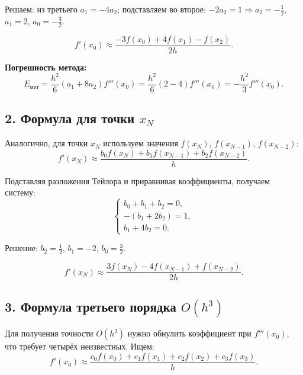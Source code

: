 \documentclass{article}
\begin{document}
Решаем: из третьего $a_1 = -4a_2$; подставляем во второе: $-2a_2 = 1 \Rightarrow a_2 = -\tfrac{1}{2}$, $a_1 = 2$, $a_0 = -\tfrac{3}{2}$.

\begin{equation}
\boxed{f'(x_0) \approx \frac{-3f(x_0) + 4f(x_1) - f(x_2)}{2h}.}
\label{eq:forward_2}
\end{equation}

\textbf{Погрешность метода:}
\begin{equation}
E_{\text{мет}} = \frac{h^2}{6}(a_1 + 8a_2) f'''(x_0) = \frac{h^2}{6}(2 - 4) f'''(x_0) = -\frac{h^2}{3} f'''(x_0).
\end{equation}

\subsection*{2. Формула для точки $x_N$}

Аналогично, для точки $x_N$ используем значения $f(x_N)$, $f(x_{N-1})$, $f(x_{N-2})$:
\begin{equation}
f'(x_N) \approx \frac{b_0 f(x_N) + b_1 f(x_{N-1}) + b_2 f(x_{N-2})}{h}.
\end{equation}

Подставляя разложения Тейлора и приравнивая коэффициенты, получаем систему:
\begin{equation}
\begin{cases}
b_0 + b_1 + b_2 = 0, \\
-(b_1 + 2b_2) = 1, \\
b_1 + 4b_2 = 0.
\end{cases}
\end{equation}

Решение: $b_2 = \tfrac{1}{2}$, $b_1 = -2$, $b_0 = \tfrac{3}{2}$.

\begin{equation}
\boxed{f'(x_N) \approx \frac{3f(x_N) - 4f(x_{N-1}) + f(x_{N-2})}{2h}.}
\label{eq:backward_2}
\end{equation}

\subsection*{3. Формула третьего порядка $O(h^3)$}

Для получения точности $O(h^3)$ нужно обнулить коэффициент при $f'''(x_0)$, что требует четырёх неизвестных. Ищем:
\begin{equation}
f'(x_0) \approx \frac{c_0 f(x_0) + c_1 f(x_1) + c_2 f(x_2) + c_3 f(x_3)}{h}.
\end{equation}
\end{document}
